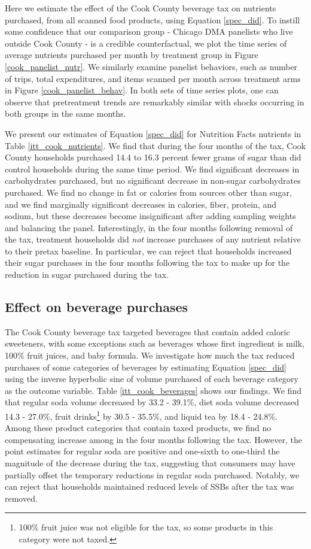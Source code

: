 \documentclass[12pt]{article}
\begin{document}
Here we estimate the effect of the Cook County beverage tax on nutrients purchased, from all scanned food products, using Equation \ref{spec_did}. To instill some confidence that our comparison group - Chicago DMA panelists who live outside Cook County - is a credible counterfactual, we plot the time series of average nutrients purchased per month by treatment group in Figure \ref{cook_panelist_nutr}. We similarly examine panelist behaviors, such as number of trips, total expenditures, and items scanned per month across treatment arms in Figure \ref{cook_panelist_behav}. In both sets of time series plots, one can observe that pretreatment trends are remarkably similar with shocks occurring in both groups in the same months.

We present our estimates of Equation \ref{spec_did} for Nutrition Facts nutrients in Table \ref{itt_cook_nutrients}. We find that during the four months of the tax, Cook County households purchased 14.4 to 16.3 percent fewer grams of sugar than did control households during the same time period. We find significant decreases in carbohydrates purchased, but no significant decrease in non-sugar carbohydrates purchased. We find no change in fat or calories from sources other than sugar, and we find marginally significant decreases in calories, fiber, protein, and sodium, but these decreases become insignificant after adding sampling weights and balancing the panel. Interestingly, in the four months following removal of the tax, treatment households did \textit{not} increase purchases of any nutrient relative to their pretax baseline. In particular, we can reject that households increased their sugar purchases in the four months following the tax to make up for the reduction in sugar purchased during the tax.

\subsection{Effect on beverage purchases}

The Cook County beverage tax targeted beverages that contain added caloric sweeteners, with some exceptions such as beverages whose first ingredient is milk, 100\% fruit juices, and baby formula. We investigate how much the tax reduced purchases of some categories of beverages by estimating Equation \ref{spec_did} using the inverse hyperbolic sine of volume purchased of each beverage category as the outcome variable. Table \ref{itt_cook_beverages} shows our findings. We find that regular soda volume decreased by 33.2 - 39.1\%, diet soda volume decreased 14.3 - 27.0\%, fruit drinks\footnote{100\% fruit juice was not eligible for the tax, so some products in this category were not taxed.} by 30.5 - 35.5\%, and liquid tea by 18.4 - 24.8\%. Among these product categories that contain taxed products, we find no compensating increase among in the four months following the tax. However, the point estimates for regular soda are positive and one-sixth to one-third the magnitude of the decrease during the tax, suggesting that consumers may have partially offset the temporary reductions in regular soda purchased. Notably, we can reject that households maintained reduced levels of SSBs after the tax was removed.
\end{document}

